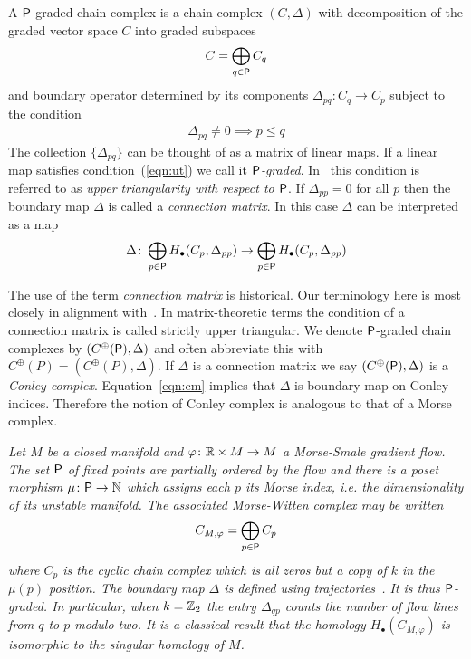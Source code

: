 A ${\mathsf P}$-graded chain complex is a chain complex $(C,\Delta)$ with decomposition of the graded vector space $C$ into graded subspaces $$C=\bigoplus_{q\in {\mathsf P}} C_q$$ and boundary operator determined by its components $\Delta_{pq}\colon C_q\to C_p$ subject to the condition 
\begin{align}\label{eqn:ut}
\Delta_{pq}\neq 0\implies p\leq q
\end{align}  The collection $\{\Delta_{pq}\}$ can be thought of as a matrix of linear maps. If a linear map satisfies condition~(\ref{eqn:ut}) we call it {\em ${\mathsf P}$-graded}.  In~\cite{fran} this condition is referred to as {\em upper triangularity with respect to ${\mathsf P}$}.   If $\Delta_{pp} = 0$ for all $p$ then the boundary map $\Delta$ is called a {\em connection matrix}.  In this case $\Delta$ can be interpreted as a map
\begin{align}\label{eqn:cm}
\Delta \colon \bigoplus_{p\in {\mathsf P}} H_\bullet(C_p,\Delta_{pp})\to \bigoplus_{p\in {\mathsf P}} H_\bullet(C_p,\Delta_{pp})
\end{align}

The use of the term {\em connection matrix} is historical.  Our terminology here is most closely in alignment with~\cite{fran}. In matrix-theoretic terms the condition of a connection matrix is called strictly upper triangular.  We denote ${\mathsf P}$-graded chain complexes by $(C^\oplus({\mathsf P}),\Delta)$ and often abbreviate this with $C^\oplus(P)=(C^\oplus(P),\Delta)$.  If  $\Delta$ is a connection matrix we say $(C^\oplus({\mathsf P}),\Delta)$ is a {\em Conley complex}.  Equation~\ref{eqn:cm} implies that $\Delta$ is boundary map on Conley indices.  Therefore the notion of Conley complex is analogous to that of a Morse complex.


\begin{ex}
{\em
Let $M$ be a closed manifold and $\varphi\colon {\mathbb{R}}\times M\to M$ a Morse-Smale gradient flow.  The set ${\mathsf P}$ of fixed points are partially ordered by the flow and there is a poset morphism $\mu\colon {\mathsf P}\to {\mathbb{N}}$ which assigns each $p$ its Morse index, i.e. the dimensionality of its unstable manifold.   The associated Morse-Witten complex may be written $$C_{M,\varphi} = \bigoplus_{p\in {\mathsf P}} C_p$$ where $C_p$ is the cyclic chain complex which is all zeros but a copy of $k$ in the $\mu(p)$ position.  The boundary map $\Delta$ is defined using trajectories~\cite{floer,robbin:salamon2}.  It is thus ${\mathsf P}$-graded. In particular, when $k={\mathbb{Z}}_2$ the entry $\Delta_{qp}$ counts the number of flow lines from $q$ to $p$ modulo two.  It is a classical result that the homology $H_\bullet(C_{M,\varphi})$ is isomorphic to the singular homology of $M$.
}
\end{ex}


